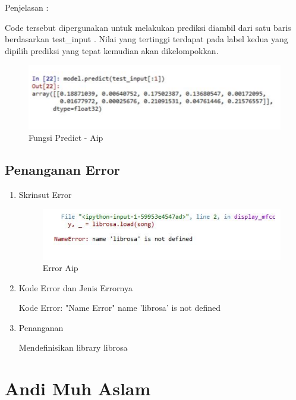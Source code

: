 \begin{enumerate}
\begin{itemize}
\par Penjelasan :
\par Code tersebut dipergunakan untuk melakukan prediksi diambil dari satu baris berdasarkan test\_input . Nilai yang tertinggi terdapat pada label kedua yang dipilih prediksi yang tepat kemudian akan dikelompokkan.
\par
\par
\begin{figure}[ht]
\centering
\includegraphics[scale=0.2]{figures/AIP/predict.PNG}
\caption{Fungsi Predict - Aip}
\label{fungsi-predict-Aip}
\end{figure}
\par
\par
\end{itemize}
\end{enumerate}

\subsection{Penanganan Error}
\begin{enumerate}

\item Skrinsut Error
\begin{figure}[ht]
\centering
\includegraphics[scale=0.7]{figures/AIP/erroraip.PNG}
\caption{ Error Aip}
\label{6}
\end{figure}
\item Kode Error dan Jenis Errornya
\par Kode Error: "Name Error" name 'librosa' is not defined
\item Penanganan
\par Mendefinisikan library librosa
\end{enumerate}

\section{Andi Muh Aslam}

